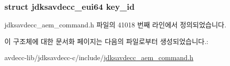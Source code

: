 \subsubsection[{\texorpdfstring{key\+\_\+id}{key_id}}]{\setlength{\rightskip}{0pt plus 5cm}struct {\bf jdksavdecc\+\_\+eui64} key\+\_\+id}\hypertarget{structjdksavdecc__aem__command__enable__transport__security_a37cbdf6056556ccfaee3ab01dc7c3032}{}\label{structjdksavdecc__aem__command__enable__transport__security_a37cbdf6056556ccfaee3ab01dc7c3032}


jdksavdecc\+\_\+aem\+\_\+command.\+h 파일의 41018 번째 라인에서 정의되었습니다.



이 구조체에 대한 문서화 페이지는 다음의 파일로부터 생성되었습니다.\+:\begin{DoxyCompactItemize}
\item 
avdecc-\/lib/jdksavdecc-\/c/include/\hyperlink{jdksavdecc__aem__command_8h}{jdksavdecc\+\_\+aem\+\_\+command.\+h}\end{DoxyCompactItemize}
